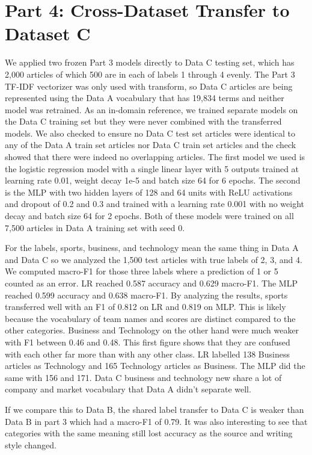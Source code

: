 \documentclass[letterpaper,conference,compsoc,onecolumn]{IEEEtran}
\begin{document}
\section{Part 4: Cross-Dataset Transfer to Dataset C}

We applied two frozen Part 3 models directly to Data C testing set, which has 2,000 articles of which 500 are in each of labels 1 through 4 evenly. The Part 3 TF-IDF vectorizer was only used with transform, so Data C articles are being represented using the Data A vocabulary that has 19,834 terms and neither model was retrained. As an in-domain reference, we trained separate models on the Data C training set but they were never combined with the transferred models. We also checked to ensure no Data C test set articles were identical to any of the Data A train set articles nor Data C train set articles and the check showed that there were indeed no overlapping articles. The first model we used is the logistic regression model with a single linear layer with 5 outputs trained at learning rate 0.01, weight decay 1e-5 and batch size 64 for 6 epochs. The second is the MLP with two hidden layers of 128 and 64 units with ReLU activations and dropout of 0.2 and 0.3 and trained with a learning rate 0.001 with no weight decay and batch size 64 for 2 epochs. Both of these models were trained on all 7,500 articles in Data A training set with seed 0.

For the labels, sports, business, and technology mean the same thing in Data A and Data C so we analyzed the 1,500 test articles with true labels of 2, 3, and 4. We computed macro-F1 for those three labels where a prediction of 1 or 5 counted as an error. LR reached 0.587 accuracy and 0.629 macro-F1. The MLP reached 0.599 accuracy and 0.638 macro-F1. By analyzing the results, sports transferred well with an F1 of 0.812 on LR and 0.819 on MLP. This is likely because the vocabulary of team names and scores are distinct compared to the other categories. Business and Technology on the other hand were much weaker with F1 between 0.46 and 0.48. This first figure shows that they are confused with each other far more than with any other class. LR labelled 138 Business articles as Technology and 165 Technology articles as Business. The MLP did the same with 156 and 171. Data C business and technology new share a lot of company and market vocabulary that Data A didn't separate well.

If we compare this to Data B, the shared label transfer to Data C is weaker than Data B in part 3 which had a macro-F1 of 0.79. It was also interesting to see that categories with the same meaning still lost accuracy as the source and writing style changed.
\end{document}
